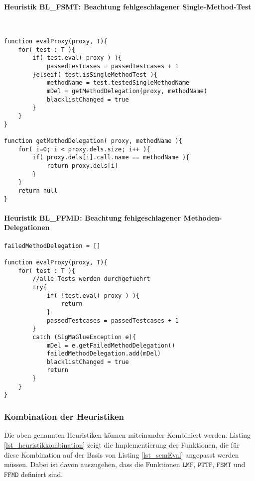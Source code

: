 \documentclass[a4paper,12pt]{article}
\begin{document}
\paragraph{Heuristik BL\_FSMT: Beachtung fehlgeschlagener Single-Method-Test}
\noindent
\newline

\begin{lstlisting}[style = pseudo, caption = Semantische Evaluation mit Heuristik SMTE, captionpos = b, label = lst_semEval_SMTE]


function evalProxy(proxy, T){
	for( test : T ){	
		if( test.eval( proxy ) ){
			passedTestcases = passedTestcases + 1
		}elseif( test.isSingleMethodTest ){
			methodName = test.testedSingleMethodName
			mDel = getMethodDelegation(proxy, methodName)
			blacklistChanged = true
		}		
	}
}

function getMethodDelegation( proxy, methodName ){
	for( i=0; i < proxy.dels.size; i++ ){
		if( proxy.dels[i].call.name == methodName ){
			return proxy.dels[i]
		}
	}
	return null
}

\end{lstlisting}



\paragraph{Heuristik BL\_FFMD: Beachtung fehlgeschlagener Methoden-Delegationen}
\noindent
\newline


\begin{lstlisting}[style = pseudo, caption = Abfangen der SigMaGlueException beim Testen eines Proxies, captionpos = b, label = lst_evalProxyFNDE]
failedMethodDelegation = []

function evalProxy(proxy, T){
	for( test : T ){
		//alle Tests werden durchgefuehrt	
		try{
			if( !test.eval( proxy ) ){
				return
			}
			passedTestcases = passedTestcases + 1
		}
		catch (SigMaGlueException e){
			mDel = e.getFailedMethodDelegation()
			failedMethodDelegation.add(mDel)
			blacklistChanged = true
			return
		} 
	}
}
\end{lstlisting}


\subsubsection{Kombination der Heuristiken}
Die oben genannten Heuristiken können miteinander Kombiniert werden. Listing \ref{lst_heuristikkombination} zeigt die Implementierung der Funktionen, die für diese Kombination auf der Basis von Listing \ref{lst_semEval} angepasst werden müssen. Dabei ist  davon auszugehen, dass die Funktionen $\texttt{LMF}$, $\texttt{PTTF}$, $\texttt{FSMT}$ und $\texttt{FFMD}$ definiert sind.
\end{document}
